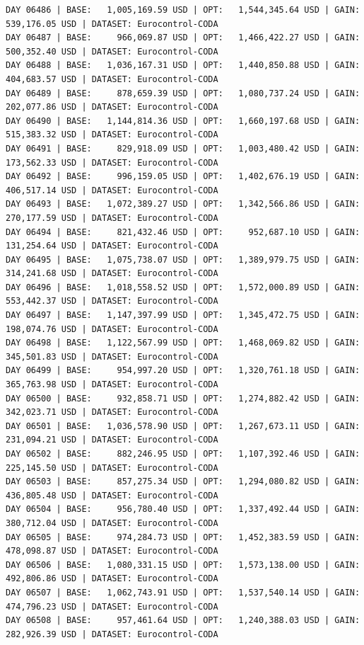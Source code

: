 \documentclass[11pt,a4paper]{article}
\begin{document}
\begin{verbatim}
DAY 06486 | BASE:   1,005,169.59 USD | OPT:   1,544,345.64 USD | GAIN: 539,176.05 USD | DATASET: Eurocontrol-CODA
DAY 06487 | BASE:     966,069.87 USD | OPT:   1,466,422.27 USD | GAIN: 500,352.40 USD | DATASET: Eurocontrol-CODA
DAY 06488 | BASE:   1,036,167.31 USD | OPT:   1,440,850.88 USD | GAIN: 404,683.57 USD | DATASET: Eurocontrol-CODA
DAY 06489 | BASE:     878,659.39 USD | OPT:   1,080,737.24 USD | GAIN: 202,077.86 USD | DATASET: Eurocontrol-CODA
DAY 06490 | BASE:   1,144,814.36 USD | OPT:   1,660,197.68 USD | GAIN: 515,383.32 USD | DATASET: Eurocontrol-CODA
DAY 06491 | BASE:     829,918.09 USD | OPT:   1,003,480.42 USD | GAIN: 173,562.33 USD | DATASET: Eurocontrol-CODA
DAY 06492 | BASE:     996,159.05 USD | OPT:   1,402,676.19 USD | GAIN: 406,517.14 USD | DATASET: Eurocontrol-CODA
DAY 06493 | BASE:   1,072,389.27 USD | OPT:   1,342,566.86 USD | GAIN: 270,177.59 USD | DATASET: Eurocontrol-CODA
DAY 06494 | BASE:     821,432.46 USD | OPT:     952,687.10 USD | GAIN: 131,254.64 USD | DATASET: Eurocontrol-CODA
DAY 06495 | BASE:   1,075,738.07 USD | OPT:   1,389,979.75 USD | GAIN: 314,241.68 USD | DATASET: Eurocontrol-CODA
DAY 06496 | BASE:   1,018,558.52 USD | OPT:   1,572,000.89 USD | GAIN: 553,442.37 USD | DATASET: Eurocontrol-CODA
DAY 06497 | BASE:   1,147,397.99 USD | OPT:   1,345,472.75 USD | GAIN: 198,074.76 USD | DATASET: Eurocontrol-CODA
DAY 06498 | BASE:   1,122,567.99 USD | OPT:   1,468,069.82 USD | GAIN: 345,501.83 USD | DATASET: Eurocontrol-CODA
DAY 06499 | BASE:     954,997.20 USD | OPT:   1,320,761.18 USD | GAIN: 365,763.98 USD | DATASET: Eurocontrol-CODA
DAY 06500 | BASE:     932,858.71 USD | OPT:   1,274,882.42 USD | GAIN: 342,023.71 USD | DATASET: Eurocontrol-CODA
DAY 06501 | BASE:   1,036,578.90 USD | OPT:   1,267,673.11 USD | GAIN: 231,094.21 USD | DATASET: Eurocontrol-CODA
DAY 06502 | BASE:     882,246.95 USD | OPT:   1,107,392.46 USD | GAIN: 225,145.50 USD | DATASET: Eurocontrol-CODA
DAY 06503 | BASE:     857,275.34 USD | OPT:   1,294,080.82 USD | GAIN: 436,805.48 USD | DATASET: Eurocontrol-CODA
DAY 06504 | BASE:     956,780.40 USD | OPT:   1,337,492.44 USD | GAIN: 380,712.04 USD | DATASET: Eurocontrol-CODA
DAY 06505 | BASE:     974,284.73 USD | OPT:   1,452,383.59 USD | GAIN: 478,098.87 USD | DATASET: Eurocontrol-CODA
DAY 06506 | BASE:   1,080,331.15 USD | OPT:   1,573,138.00 USD | GAIN: 492,806.86 USD | DATASET: Eurocontrol-CODA
DAY 06507 | BASE:   1,062,743.91 USD | OPT:   1,537,540.14 USD | GAIN: 474,796.23 USD | DATASET: Eurocontrol-CODA
DAY 06508 | BASE:     957,461.64 USD | OPT:   1,240,388.03 USD | GAIN: 282,926.39 USD | DATASET: Eurocontrol-CODA

\end{verbatim}
\end{document}
